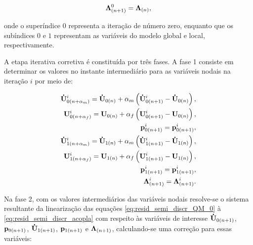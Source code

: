 \begin{align}
	\boldsymbol{\Lambda}_{(n+1)}^{0} = \boldsymbol{\Lambda}_{(n)},\label{eq:pred_lag_mult}
\end{align}

\noindent onde o superíndice $0$ representa a iteração de número zero, enquanto que os subíndices $0$ e $1$ representam as variáveis do modelo global e local, respectivamente.

A etapa iterativa corretiva é constituída por três fases. A fase 1 consiste em determinar os valores no instante intermediário para as variáveis nodais na iteração $i$ por meio de:

\begin{align}
	\mathbf{\dot{U}}_{0({n+\alpha_m})}^{i} = \mathbf{\dot{U}}_{0(n)} + \alpha_m \left( \mathbf{\dot{U}}_{0(n+1)}^{i} - \mathbf{\dot{U}}_{0(n)} \right), \label{eq:inter_acel_0}\\
	\mathbf{U}_{0(n+\alpha_f)}^{i} = \mathbf{U}_{0(n)} + \alpha_f \left( \mathbf{U}_{0(n+1)}^{i} - \mathbf{U}_{0(n)} \right), \label{eq:inter_vel_0}\\
	\mathbf{p}_{0(n+1)}^{i} = \mathbf{p}_{0(n+1)}^{i}, \label{eq:inter_press_0} \\
	\mathbf{\dot{U}}_{1(n+\alpha_m)}^{i} = \mathbf{\dot{U}}_{1(n)} + \alpha_m \left( \mathbf{\dot{U}}_{1(n+1)}^{i} - \mathbf{\dot{U}}_{1(n)} \right), \label{eq:inter_acel_1}\\
	\mathbf{U}_{1(n+\alpha_f)}^{i} = \mathbf{U}_{1(n)} + \alpha_f \left( \mathbf{U}_{1(n+1)}^{i} - \mathbf{U}_{1(n)} \right), \label{eq:inter_vel_1}\\
	\mathbf{p}_{1(n+1)}^{i} = \mathbf{p}_{1(n+1)}^{i},\label{eq:inter_press_1} \\
	\boldsymbol{\Lambda}_{(n+1)}^{i} = \boldsymbol{\Lambda}_{(n+1)}^{i}. \label{eq:inter_lag_mult}
\end{align}

Na fase 2, com os valores intermediários das variáveis nodais resolve-se o sistema resultante da linearização das equações \autoref{eq:resid_semi_discr_QM_0} à \autoref{eq:resid_semi_discr_acopla} com respeito às variáveis de interesse $\mathbf{\dot{U}}_{0(n+1)}$, $\mathbf{p}_{0(n+1)}$,  $\mathbf{\dot{U}}_{1(n+1)}$, $\mathbf{p}_{1(n+1)}$ e $\boldsymbol{\Lambda}_{(n+1)}$, calculando-se uma correção para essas variáveis:

